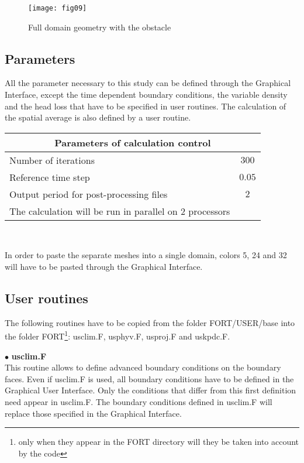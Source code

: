 \begin{figure}[h!]
\begin{center}
\texttt{[image: fig09]}
\caption{Full domain geometry with the obstacle}
\label{figante41}
\end{center}
\end{figure}



        \subsection{Parameters}

All the parameter necessary to this study can be defined through the Graphical
Interface, except the time dependent boundary conditions, the variable
density and the head loss that have to be specified in user routines. The
calculation of the spatial average is also defined by a user routine.


\begin{center}
\begin{tabular}{|l|c|}
\hline
\multicolumn{2}{|c|}{Parameters of calculation control} \\
\hline
Number of iterations & $300$ \\
\hline
Reference time step & $0.05$ \\
\hline
Output period for post-processing files& $2$ \\
\hline
The calculation will be run in parallel on 2 processors \\
\end{tabular}\\
\end{center}

In order to paste the separate meshes into a single domain, colors 5, 24 and 32
will have to be pasted through the Graphical Interface.


        \subsection{User routines}

The following routines have to be copied from the folder FORT/USER/base into the
folder FORT\footnote{only when they appear in the FORT directory will they be
taken into account by the code}: usclim.F, usphyv.F, usproj.F and uskpdc.F.

$\bullet$ {\bfseries usclim.F}\\
This routine allows to define advanced boundary conditions on the boundary
faces. Even if usclim.F is used, all boundary conditions have to be defined in
the Graphical User Interface. Only the conditions that differ from this first
definition need appear in usclim.F. The boundary conditions defined in usclim.F
will replace those specified in the Graphical Interface.

